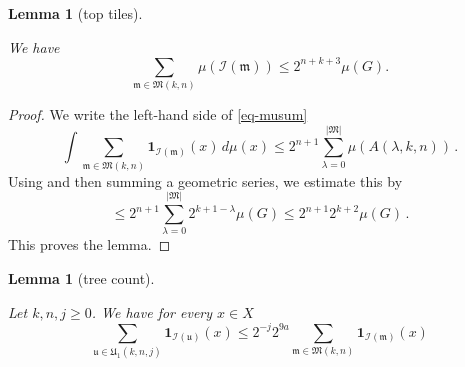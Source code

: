 \documentclass[10pt,a4paper]{article}
\theoremstyle{plain}
\newtheorem{lemma}[theorem]{Lemma}
\theoremstyle{definition}
\numberwithin{equation}{subsection}
\newcommand{\fu}{{\mathfrak u}}
\newcommand{\fU}{{\mathfrak U}}
\newcommand{\scI}{{\mathcal{I}}} %
\newcommand{\lean}[1]{}
\newcommand{\uses}[1]{}
\newcommand{\leanok}{}
\begin{document}
\begin{lemma}[top tiles]
\label{top-tiles}
\leanok
\lean{top_tiles}
 \uses{John-Nirenberg}
    We have
    \begin{equation}\label{eq-musum}
        \sum_{\mathfrak{m} \in \mathfrak{M}(k,n)} \mu(\scI(\mathfrak{m}))\le 2^{n+k+3}\mu(G).
    \end{equation}
\end{lemma}
\begin{proof}
\leanok
We write the left-hand side of \eqref{eq-musum}
\begin{equation}
    \int \sum_{\mathfrak{m} \in \mathfrak{M}(k,n)} \mathbf{1}_{\scI(\mathfrak{m})}(x) \, d\mu(x) \le
2^{n+1} \sum_{\lambda=0}^{|\mathfrak{M}|}\mu(A(\lambda, k,n))\,.
\end{equation}
Using 
and then summing a geometric series, we estimate this by
\begin{equation}
    \le
2^{n+1}\sum_{\lambda=0}^{|\mathfrak{M}|}
2^{k+1-\lambda}\mu(G)
\le
2^{n+1}2^{k+2}\mu(G)\, .
\end{equation}
This proves the lemma.
\end{proof}


\begin{lemma}[tree count]
\label{tree-count}
\leanok
\lean{tree_count}
Let $k,n,j\ge 0$. We have for every $x\in X$
\begin{equation}
    \sum_{\fu\in \fU_1(k,n,j)} \mathbf{1}_{\scI(\fu)}(x)
    \le 2^{-j}
    2^{9a} \sum_{\mathfrak{m}\in \mathfrak{M}(k,n)}
     \mathbf{1}_{\scI(\mathfrak{m})}(x)
\end{equation}
\end{lemma}
\end{document}

